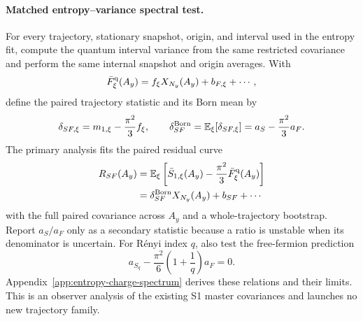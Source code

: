\documentclass[aps,prx,twocolumn,floatfix,nofootinbib,superscriptaddress,longbibliography]{revtex4-2}
\newcommand{\E}{\mathbb{E}}
\begin{document}
\paragraph*{Matched entropy--variance spectral test.}
For every trajectory, stationary snapshot, origin, and interval used in the entropy fit,
compute the quantum interval variance from the same restricted covariance and perform the
same internal snapshot and origin averages.  With
\begin{equation}
 \bar F_{\xi}^{\rm q}(A_y)
 =f_{\xi}X_{N_y}(A_y)+b_{F,\xi}+\cdots,
 \label{eq:trajectory-charge-variance-fit}
\end{equation}
define the paired trajectory statistic and its Born mean by
\begin{equation}
 \delta_{SF,\xi}=m_{1,\xi}-\frac{\pi^2}{3}f_{\xi},
 \qquad
 \delta_{SF}^{\rm Born}
 =\E_\xi[\delta_{SF,\xi}]
 =a_S-\frac{\pi^2}{3}a_F .
 \label{eq:matched-entropy-variance-slope}
\end{equation}
The primary analysis fits the paired residual curve
\begin{equation}
 \begin{aligned}
 R_{SF}(A_y)&=\E_\xi\left[
 \bar S_{1,\xi}(A_y)-\frac{\pi^2}{3}
 \bar F_{\xi}^{\rm q}(A_y)\right]\\
 &=\delta_{SF}^{\rm Born}X_{N_y}(A_y)+b_{SF}+\cdots
 \end{aligned}
 \label{eq:matched-entropy-variance-residual}
\end{equation}
with the full paired covariance across $A_y$ and a whole-trajectory bootstrap.  Report
$a_S/a_F$ only as a secondary statistic because a ratio is unstable when its denominator
is uncertain.  For R\'enyi index $q$, also test the free-fermion prediction
\begin{equation}
 a_{S_q}-\frac{\pi^2}{6}\left(1+\frac1q\right)a_F=0 .
 \label{eq:matched-renyi-variance-slope}
\end{equation}
Appendix~\ref{app:entropy-charge-spectrum} derives these relations and their limits.
This is an observer analysis of the existing S1 master covariances and launches no new
trajectory family.
\end{document}
